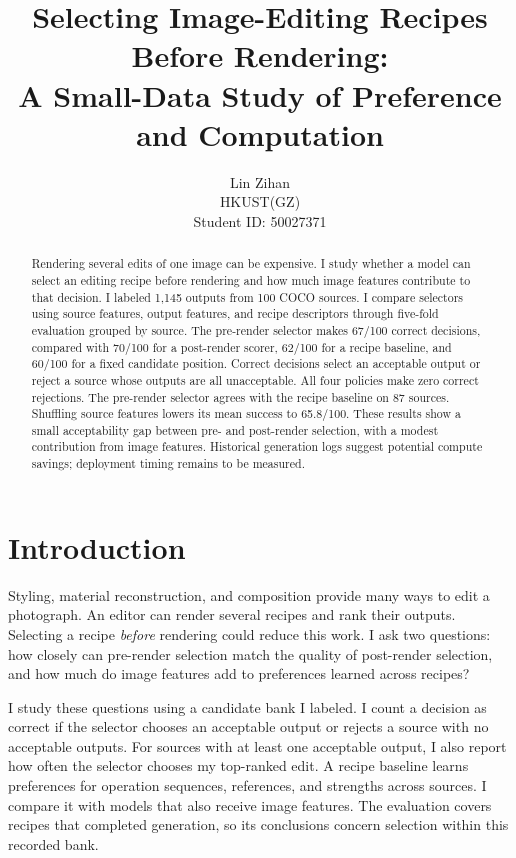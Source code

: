\documentclass{article}
\title{Selecting Image-Editing Recipes Before Rendering:\\A Small-Data Study of Preference and Computation}
\author{Lin Zihan\\HKUST(GZ)\\Student ID: 50027371}
\begin{document}
\maketitle

\begin{abstract}
Rendering several edits of one image can be expensive. I study whether a model can select an editing recipe before rendering and how much image features contribute to that decision. I labeled 1,145 outputs from 100 COCO sources. I compare selectors using source features, output features, and recipe descriptors through five-fold evaluation grouped by source. The pre-render selector makes 67/100 correct decisions, compared with 70/100 for a post-render scorer, 62/100 for a recipe baseline, and 60/100 for a fixed candidate position. Correct decisions select an acceptable output or reject a source whose outputs are all unacceptable. All four policies make zero correct rejections. The pre-render selector agrees with the recipe baseline on 87 sources. Shuffling source features lowers its mean success to 65.8/100. These results show a small acceptability gap between pre- and post-render selection, with a modest contribution from image features. Historical generation logs suggest potential compute savings; deployment timing remains to be measured.
\end{abstract}

\section{Introduction}
Styling, material reconstruction, and composition provide many ways to edit a photograph. An editor can render several recipes and rank their outputs. Selecting a recipe \emph{before} rendering could reduce this work. I ask two questions: how closely can pre-render selection match the quality of post-render selection, and how much do image features add to preferences learned across recipes?

I study these questions using a candidate bank I labeled. I count a decision as correct if the selector chooses an acceptable output or rejects a source with no acceptable outputs. For sources with at least one acceptable output, I also report how often the selector chooses my top-ranked edit. A recipe baseline learns preferences for operation sequences, references, and strengths across sources. I compare it with models that also receive image features. The evaluation covers recipes that completed generation, so its conclusions concern selection within this recorded bank.
\end{document}
